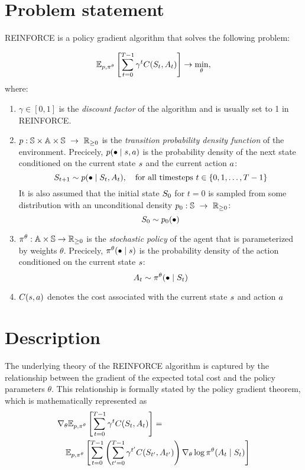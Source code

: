 \documentclass[12pt,twoside]{../../mitthesis}
\begin{document}
\section*{Problem statement}
REINFORCE is a policy gradient algorithm that solves the following problem:

\begin{equation}
    \label{eqn_reinforce_problem}
    \E[\transit, \policy^{\theta}]{\sum_{t = 0}^{T-1} \gamma ^ t \Cost(\State_{t}, \Action_{t})} \ra \min_{\theta},
\end{equation}
where:
\begin{enumerate}
    \item $\gamma \in [0, 1]$ is the \textit{discount factor} of the algorithm and is usually set to 1 in REINFORCE. 
    \item  $p : \mathbb S \times \mathbb A \times \mathbb S \ \rightarrow \ {\mathbb{R}}_{\geq 0}$ is the \textit{transition probability density function} of the environment. Precicely, $p(\bullet \mid s, a)$ is the probability density of the next state conditioned on the current state $s$ and the current action $a$:
    $$
        S_{t+1} \sim p(\bullet \mid S_t, A_t), \quad \text{for all timesteps } t \in \{0, 1, \dots, T-1\} 
    $$
    It is also assumed that the initial state $S_0$ for $t = 0$ is sampled from some distribution with an unconditional density $p_0 : \mathbb S \ \rightarrow \ {\mathbb{R}}_{\geq 0}$:
    $$
        S_0 \sim p_0(\bullet)
    $$
    \item $\pi^{\theta} : \mathbb A \times \mathbb S \rightarrow {\mathbb{R}}_{\geq 0}$ is the \textit{stochastic policy} of the agent that is parameterized by weights $\theta$. Precicely, $\pi^{\theta}(\bullet \mid s)$ is the probability density of the action conditioned on the current state $s$:
    $$
        A_t \sim \pi^{\theta}(\bullet \mid S_t)
    $$
    \item $C(s, a)$ denotes the cost associated with the current state $s$ and action $a$
\end{enumerate}

\section*{Description}
The underlying theory of the REINFORCE algorithm is captured by the relationship between the gradient of the expected total cost and the policy parameters $\theta$. 
This relationship is formally stated by the policy gradient theorem, which is mathematically represented as
\begin{equation}
    \label{eqn_reinforce_log_lh_trick}
    \begin{aligned}
    &\nabla_{\theta} \E[\transit, \policy^{\theta}]{\sum_{t = 0}^{T-1} \gamma ^ t \Cost(\State_{t}, \Action_{t})} = \\ 
    &\quad\E[\transit, \policy^{\theta}]{ \sum_{t = 0}^{T-1}\left(\sum_{t' = 0}^{T-1} \gamma ^ {t'} \Cost(\State_{t'}, \Action_{t'})\right)  \nabla_{\theta}\log \policy^{\theta}(\Action_t \mid \State_t)}
    \end{aligned}
\end{equation}
\end{document}
